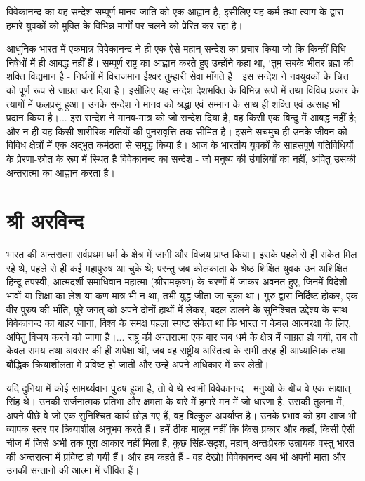 विवेकानन्द का यह सन्देश सम्पूर्ण मानव-जाति को एक आह्वान है, इसीलिए यह कर्म तथा त्याग के द्वारा हमारे युवकों को मुक्ति के विभिन्न मार्गों पर चलने को प्रेरित कर रहा है। 

आधुनिक भारत में एकमात्र विवेकानन्द ने ही एक ऐसे महान् सन्देश का प्रचार किया जो कि किन्हीं विधि-निषेधों में ही आबद्ध नहीं हैं। सम्पूर्ण राष्ट्र का आह्वान करते हुए उन्होंने कहा था, ‘तुम सबके भीतर ब्रह्म की शक्ति विद्यमान है - निर्धनों में विराजमान ईश्वर तुम्हारी सेवा माँगते हैं। इस सन्देश ने नवयुवकों के चित्त को पूर्ण रूप से जाग्रत कर दिया है। इसीलिए यह सन्देश देशभक्ति के विभिन्न रूपों में तथा विविध प्रकार के त्यागों में फलप्रसू हुआ। उनके सन्देश ने मानव को श्रद्धा एवं सम्मान के साथ ही शक्ति एवं उत्साह भी प्रदान किया है।... इस सन्देश ने मानव-मात्र को जो सन्देश दिया है, वह किसी एक बिन्दु में आबद्ध नहीं है; और न ही यह किसी शारीरिक गतियों की पुनरावृत्ति तक सीमित है। इसने सचमुच ही उनके जीवन को विविध क्षेत्रों में एक अद्भुत कर्मठता से समृद्ध किया है। आज के भारतीय युवकों के साहसपूर्ण गतिविधियों के प्रेरणा-स्रोत के रूप में स्थित है विवेकानन्द का सन्देश - जो मनुष्य की उंगलियों का नहीं, अपितु उसकी अन्तरात्मा का आह्वान करता है।


\section*{श्री अरविन्द}


भारत की अन्तरात्मा सर्वप्रथम धर्म के क्षेत्र में जागी और विजय प्राप्त किया। इसके पहले से ही संकेत मिल रहे थे, पहले से ही कई महापुरुष आ चुके थे; परन्तु जब कोलकाता के श्रेष्ठ शिक्षित युवक उन अशिक्षित हिन्दू तपस्वी, आत्मदर्शी समाधिवान महात्मा (श्रीरामकृष्ण) के चरणों में जाकर अवनत हुए, जिनमें विदेशी भावों या शिक्षा का लेश या कण मात्र भी न था, तभी युद्ध जीता जा चुका था। गुरु द्वारा निर्दिष्ट होकर, एक वीर पुरुष की भाँति, पूरे जगत् को अपने दोनों हाथों में लेकर, बदल डालने के सुनिश्चित उद्देश्य के साथ विवेकानन्द का बाहर जाना, विश्व के समक्ष पहला स्पष्ट संकेत था कि भारत न केवल आत्मरक्षा के लिए, अपितु विजय करने को जागा है।... राष्ट्र की अन्तरात्मा एक बार जब धर्म के क्षेत्र में जाग्रत हो गयी, तब तो केवल समय तथा अवसर की ही अपेक्षा थी, जब वह राष्ट्रीय अस्तित्व के सभी तरह ही आध्यात्मिक तथा बौद्धिक क्रियाशीलता में प्रविष्ट हो जाती और उन्हें अपने अधिकार में कर लेती। 

यदि दुनिया में कोई सामर्थ्यवान पुरुष हुआ है, तो वे थे स्वामी विवेकानन्द। मनुष्यों के बीच वे एक साक्षात् सिंह थे। उनकी सर्जनात्मक प्रतिभा और क्षमता के बारे में हमारे मन में जो धारणा है, उसकी तुलना में, अपने पीछे वे जो एक सुनिश्चित कार्य छोड़ गए हैं, वह बिल्कुल अपर्याप्त है। उनके प्रभाव को हम आज भी व्यापक स्तर पर क्रियाशील अनुभव करते हैं। हमें ठीक मालूम नहीं कि किस प्रकार और कहाँ, किसी ऐसी चीज में जिसे अभी तक पूरा आकार नहीं मिला है, कुछ सिंह-सदृश, महान् अन्तःप्रेरक उन्नायक वस्तु भारत की अन्तरात्मा में प्रविष्ट हो गयी हैं। और हम कहते हैं - वह देखो! विवेकानन्द अब भी अपनी माता और उनकी सन्तानों की आत्मा में जीवित हैं। 


